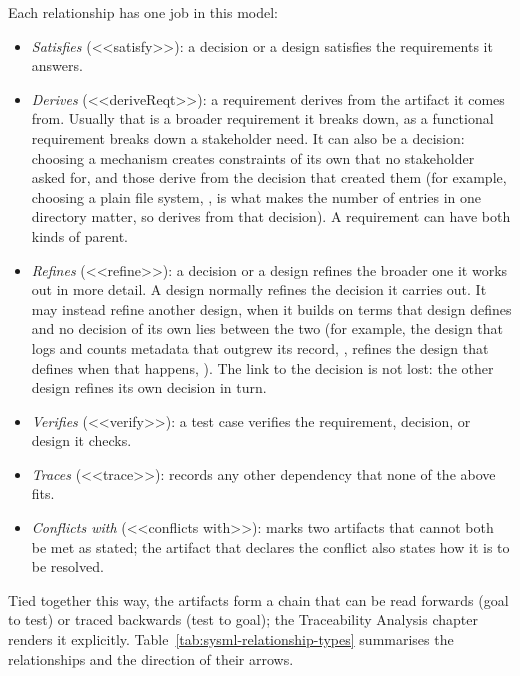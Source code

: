 
Each relationship has one job in this model:
\begin{itemize}
  \item \emph{Satisfies} (<<satisfy>>): a decision or a design satisfies the
    requirements it answers.
  \item \emph{Derives} (<<deriveReqt>>): a requirement derives from the
    artifact it comes from. Usually that is a broader requirement it breaks
    down, as a functional requirement breaks down a stakeholder need. It can
    also be a decision: choosing a mechanism creates constraints of its own
    that no stakeholder asked for, and those derive from the decision that
    created them (for example, choosing a plain file system,
    , is what makes the number of entries
    in one directory matter, so  derives
    from that decision). A requirement can have both kinds of parent.
  \item \emph{Refines} (<<refine>>): a decision or a design refines the broader one it works
    out in more detail. A design normally refines the decision it carries out.
    It may instead refine another design, when it builds on terms that design
    defines and no decision of its own lies between the two (for example, the
    design that logs and counts metadata that outgrew its record,
    , refines the design that defines when
    that happens, ). The link to the decision is not
    lost: the other design refines its own decision in turn.
  \item \emph{Verifies} (<<verify>>): a test case verifies the requirement,
    decision, or design it checks.
  \item \emph{Traces} (<<trace>>): records any other dependency that none of the
    above fits.
  \item \emph{Conflicts with} (<<conflicts with>>): marks
    two artifacts that cannot both be met as stated; the artifact that declares
    the conflict also states how it is to be resolved.
\end{itemize}
Tied together this way, the artifacts form a chain that can be read forwards
(goal to test) or traced
backwards (test to goal); the Traceability Analysis chapter renders it
explicitly. Table~\ref{tab:sysml-relationship-types} summarises the
relationships and the direction of their arrows.

